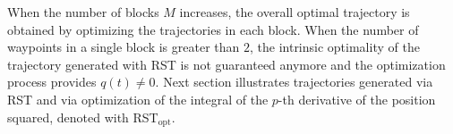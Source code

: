 When the number of blocks $M$ increases, the overall optimal trajectory is obtained by optimizing the trajectories in each block.
When the number of waypoints in a single block is greater than $2$, the intrinsic optimality of the trajectory generated with RST is not guaranteed anymore and the optimization process provides $q(t)\neq 0$.  Next section illustrates trajectories generated via RST and via optimization of the integral of the $p$-th derivative of the position squared, denoted with RST$_{\text{opt}}$. 
